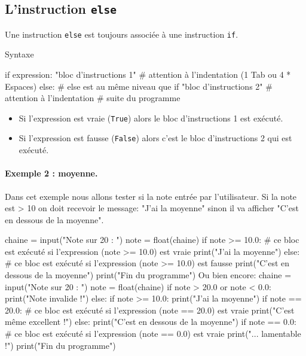 \documentclass[%
oneside,                 %
final,                   %
10pt]{article}
\begin{document}
\subsection{L'instruction \texttt{else} }

Une instruction \texttt{else} est toujours associée à une instruction \texttt{if}.

\begin{block}{Syntaxe }

\bpycod
if expression:
    "bloc d'instructions 1"    # attention à l'indentation (1 Tab ou 4 * Espaces)
else:                          # else est au même niveau que if
    "bloc d'instructions 2"    # attention à l'indentation
# suite du programme
\epycod
\begin{itemize}
\item Si l'expression est vraie (\texttt{True}) alors le bloc d'instructions 1 est exécuté.

\item Si l'expression est fausse (\texttt{False}) alors c'est le bloc d'instructions 2 qui est exécuté.
\end{itemize}

\noindent
\end{block}


\paragraph{Exemple 2 : moyenne.}
Dans cet exemple nous allons tester si la note entrée par l'utilisateur. Si la note est > 10 on doit recevoir le message: "J'ai la moyenne" sinon il va afficher "C'est en dessous de la moyenne".

\bpycod
chaine = input("Note sur 20 : ")
note = float(chaine)
if note >= 10.0:
    # ce bloc est exécuté si l'expression (note >= 10.0) est vraie
    print("J'ai la moyenne")
else:
    # ce bloc est exécuté si l'expression (note >= 10.0) est fausse
    print("C'est en dessous de la moyenne")
print("Fin du programme")
\epycod
Ou bien encore:
\bpycod
chaine = input("Note sur 20 : ")
note = float(chaine)
if note > 20.0 or note < 0.0:
    print("Note invalide !")
else:
    if note >= 10.0:
        print("J'ai la moyenne")
        if note == 20.0:
            # ce bloc est exécuté si l'expression (note == 20.0) est vraie
            print("C'est même excellent !")
    else:
        print("C'est en dessous de la moyenne")
        if note == 0.0:
            # ce bloc est exécuté si l'expression (note == 0.0) est vraie
            print("... lamentable !")
print("Fin du programme")
\epycod
\end{document}
